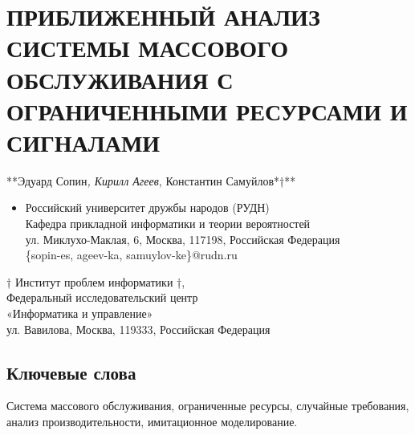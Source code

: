 \hypertarget{ux43fux440ux438ux431ux43bux438ux436ux435ux43dux43dux44bux439-ux430ux43dux430ux43bux438ux437-ux441ux438ux441ux442ux435ux43cux44b-ux43cux430ux441ux441ux43eux432ux43eux433ux43e-ux43eux431ux441ux43bux443ux436ux438ux432ux430ux43dux438ux44f-ux441-ux43eux433ux440ux430ux43dux438ux447ux435ux43dux43dux44bux43cux438-ux440ux435ux441ux443ux440ux441ux430ux43cux438-ux438-ux441ux438ux433ux43dux430ux43bux430ux43cux438}{%
\section{ПРИБЛИЖЕННЫЙ АНАЛИЗ СИСТЕМЫ МАССОВОГО ОБСЛУЖИВАНИЯ С
ОГРАНИЧЕННЫМИ РЕСУРСАМИ И
СИГНАЛАМИ}\label{ux43fux440ux438ux431ux43bux438ux436ux435ux43dux43dux44bux439-ux430ux43dux430ux43bux438ux437-ux441ux438ux441ux442ux435ux43cux44b-ux43cux430ux441ux441ux43eux432ux43eux433ux43e-ux43eux431ux441ux43bux443ux436ux438ux432ux430ux43dux438ux44f-ux441-ux43eux433ux440ux430ux43dux438ux447ux435ux43dux43dux44bux43cux438-ux440ux435ux441ux443ux440ux441ux430ux43cux438-ux438-ux441ux438ux433ux43dux430ux43bux430ux43cux438}}

**Эдуард Сопин\emph{, Кирилл Агеев}, Константин Самуйлов*†**

\begin{itemize}
\tightlist
\item
  Российский университет дружбы народов (РУДН)\\
  Кафедра прикладной информатики и теории вероятностей\\
  ул. Миклухо-Маклая, 6, Москва, 117198, Российская Федерация\\
  \{sopin-es, ageev-ka, samuylov-ke\}@rudn.ru
\end{itemize}

† Институт проблем информатики †,\\
Федеральный исследовательский центр\\
«Информатика и управление»\\
ул. Вавилова, Москва, 119333, Российская Федерация

\hypertarget{ux43aux43bux44eux447ux435ux432ux44bux435-ux441ux43bux43eux432ux430}{%
\subsection{Ключевые
слова}\label{ux43aux43bux44eux447ux435ux432ux44bux435-ux441ux43bux43eux432ux430}}

Система массового обслуживания, ограниченные ресурсы, случайные
требования, анализ производительности, имитационное моделирование.

